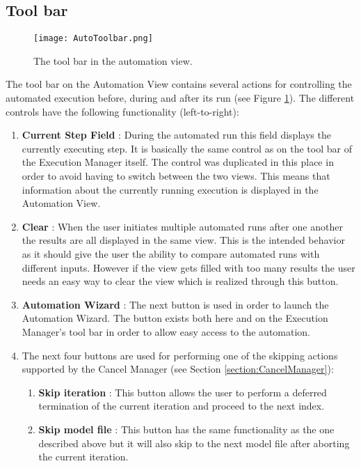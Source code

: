 \subsection{Tool bar}
\label{section:AutoToolbar}
\begin{figure}
  \centering
  \texttt{[image: AutoToolbar.png]}
  \caption[The tool bar in the automation view.]%
  {The tool bar in the automation view.\protect}
  \label{fig:AutoToolbar}
\end{figure}
The tool bar on the Automation View contains several actions for controlling the automated 
execution before, during and after its run (see Figure \ref{fig:AutoToolbar}).
The different controls have the following functionality (left-to-right):
\begin{enumerate}
 \item \textbf{Current Step Field} : During the automated run this field displays the
currently executing step. It is basically the same control as on the tool bar of the 
Execution Manager itself. The control was duplicated in this place in order to avoid
having to switch between the two views. This means that information about the currently
running execution is displayed in the Automation View.
 \item \textbf{Clear} : When the user initiates multiple automated runs after one another
the results are all displayed in the same view. This is the intended behavior as it should 
give the user the ability to compare automated runs with different inputs. However if the 
view gets filled with too many results the user needs an easy way to clear the view which
is realized through this button.
 \item \textbf{Automation Wizard} : The next button is used in order to launch the 
Automation Wizard. The button exists both here and on the Execution Manager's tool bar
in order to allow easy access to the automation.
 \item The next four buttons are used for performing one of the skipping actions supported
by the Cancel Manager (see Section \ref{section:CancelManager}):
\begin{enumerate}
 \item \textbf{Skip iteration} : This button allows the user to perform a 
deferred termination of the current iteration and proceed to the next index.
 \item \textbf{Skip model file} : This button has the same functionality as the one described
above but it will also skip to the next model file after aborting the current iteration. 

\end{enumerate}
\end{enumerate}
